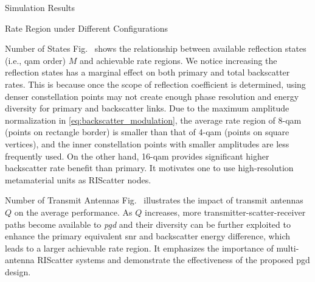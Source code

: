 \documentclass[journal]{IEEEtran}
\begin{document}
\begin{section}{Simulation Results}
\begin{subsection}{Rate Region under Different Configurations}
		\begin{subsubsection}{Number of States}
			Fig.~ shows the relationship between available reflection states (i.e., \gls{qam} order) $M$ and achievable rate regions.
			We notice increasing the reflection states has a marginal effect on both primary and total backscatter rates.
			This is because once the scope of reflection coefficient is determined, using denser constellation points may not create enough phase resolution and energy diversity for primary and backscatter links.
			Due to the maximum amplitude normalization in \eqref{eq:backscatter_modulation}, the average rate region of \num{8}-\gls{qam} (points on rectangle border) is smaller than that of \num{4}-\gls{qam} (points on square vertices), and the inner constellation points with smaller amplitudes are less frequently used.
			On the other hand, \num{16}-\gls{qam} provides significant higher backscatter rate benefit than primary.
			It motivates one to use high-resolution metamaterial units as RIScatter nodes.
		\end{subsubsection}

		\begin{subsubsection}{Number of Transmit Antennas}
			Fig.~ illustrates the impact of transmit antennas $Q$ on the average performance.
			As $Q$ increases, more transmitter-scatter-receiver paths become available to \emph{\gls{pgd}} and their diversity can be further exploited to enhance the primary equivalent \gls{snr} and backscatter energy difference, which leads to a larger achievable rate region.
			It emphasizes the importance of multi-antenna RIScatter systems and demonstrate the effectiveness of the proposed \gls{pgd} design.
		\end{subsubsection}


\end{subsection}
\end{section}
\end{document}
